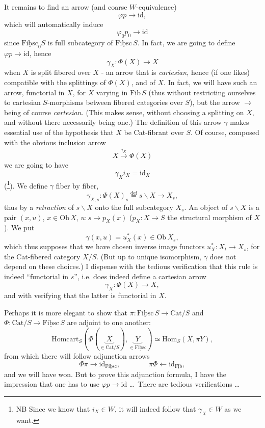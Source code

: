 \documentclass[11pt]{article}
\newcommand{\printedpage}[1]{\marginpar{\footnotesize p.~#1}}
\newcommand{\msp}[1]{\marginpar{\footnotesize [#1]}}
\newcommand{\ul}[1]{\underline{\mathrm{#1}}}
\begin{document}
\printedpage{34}

It remains to find an arrow (and coarse $W$-equivalence)
\[\varphi p \longrightarrow \mathrm{id},\]
\msp{page 55}
which will automatically induce
\[\varphi_0 p_0 \longrightarrow \mathrm{id}\]
since $\underline{\mathrm{Fibsc}}_0 S$ is full subcategory of $\ul{Fibsc}\,S$. In fact, we are going to define $\varphi p \longrightarrow \mathrm{id}$, hence
\[\boxed{\gamma_X : \Phi(X) \longrightarrow X}\]
when $X$ is split fibered over $X$ - an arrow that is \textit{cartesian,} hence (if one likes) compatible with the splittings of $\Phi(X)$, and of $X$. In fact, we will have such an arrow, functorial in $X$, for $X$ varying in $\ul{Fib}\,S$ (thus without restricting ourselves to cartesian $S$-morphisms between fibered categories over $S$), but the arrow $\longrightarrow$ being of course \textit{cartesian.} (This makes sense, without choosing a splitting on $X$, and without there necessarily being one.) The definition of this arrow $\gamma$ makes essential use of the hypothesis that $X$ be Cat-fibrant over $S$. Of course, composed with the obvious inclusion arrow %
\[X \xrightarrow{i_X} \Phi(X)\]
we are going to have
\[\gamma_X i_X = \mathrm{id}_X\]
(\footnote[39]{NB Since we know that $i_X \in W$, it will indeed follow that $\gamma_X \in W$ as we want.}). We define $\gamma$ fiber by fiber,
\[\gamma_{X,s} : \Phi(X)_s \overset{\text{def}}{=} s\backslash X \longrightarrow X_s,\]
thus by a \textit{retraction} of $s\backslash X$ onto the full subcategory $X_s$. An object of $s\backslash X$ is a pair $(x,u)$, $x \in \mathrm{Ob}\, X$, $u : s \longrightarrow p_X(x)$ ($p_X : X \longrightarrow S$ the structural morphism of $X$). We put
\[\gamma(x,u) = u_X^*(x) \in \mathrm{Ob}\, X_s,\]
\msp{page 56}
which thus supposes that we have chosen inverse image functors $u_X^* : X_t \longrightarrow X_s$, for the Cat-fibered category $X/S$. (But up to unique isomorphism, $\gamma$ does not depend on these choices.) I dispense with the tedious verification that this rule is indeed ``functorial in $s$'', i.e. does indeed define a cartesian arrow
\[\gamma_X : \Phi(X) \longrightarrow X,\]
and with verifying that the latter is functorial in $X$.

\printedpage{35}

Perhaps it is more elegant to show that $\pi : \ul{Fibsc}\,S \longrightarrow \mathrm{Cat}/S$ and $\Phi : \mathrm{Cat}/S \longrightarrow \ul{Fibsc}\,S$ are adjoint to one another:
\[\boxed{\mathrm{Homcart}_S(\Phi(\underbrace{\;X\;}_{\in\mathrm{Cat}/S}),\underbrace{\;Y\;}_{\in\ul{Fibsc}}) \simeq \mathrm{Hom}_S(X,\pi Y),}\]
from which there will follow adjunction arrows
\[\Phi\pi \longrightarrow \mathrm{id}_{\ul{Fibsc}}, \qquad\qquad \pi\Phi \longleftarrow \mathrm{id}_{\ul{Fib}},\]
 and we will have won. But to prove this adjunction formula, I have the impression that one has to use $\varphi p \longrightarrow \mathrm{id}$ \ldots\ There are tedious verifications \ldots
\end{document}
